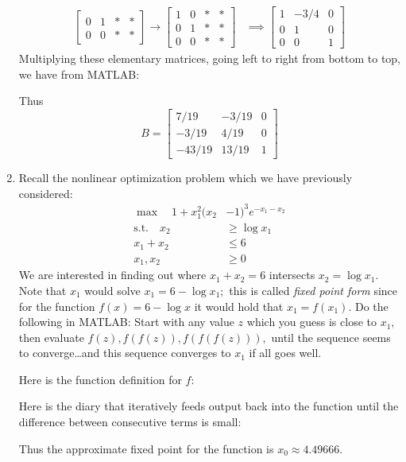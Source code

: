 \documentclass{article}
\begin{document}
\begin{enumerate}
\begin{soln}
\begin{align*}
\begin{bmatrix}
					0 & 1 & * & * \\
					0 & 0 &* & *
				\end{bmatrix} \to \begin{bmatrix}
					1 & 0 & * & * \\
					0 & 1 & * & * \\
					0 & 0 & * & *
				\end{bmatrix} &\implies \begin{bmatrix}
					1 & -3/4 & 0 \\
					0 & 1 & 0 \\
					0 & 0 & 1
				\end{bmatrix}
			\end{align*}
			Multiplying these elementary matrices, going left to right from bottom to top, we have from MATLAB:
			\lstset{language=Matlab}
			
			Thus \[B=\begin{bmatrix}
					7/19 & -3/19 & 0 \\
					-3/19 & 4/19 & 0 \\
					-43/19 & 13/19 & 1
			\end{bmatrix}\]
		\end{soln}

	\item Recall the nonlinear optimization problem which we have previously considered: 
		\begin{align*}
			\max \quad 1+x_1^2(x_2&-1)^3e^{-x_1-x_2} \\
			\text{s.t.}\quad x_2&\ge\log x_1 \\
			x_1+x_2 &\le 6 \\
			x_1, x_2 &\ge 0
		\end{align*}
		We are interested in finding out where $x_1+x_2=6$ intersects $x_2=\log x_1.$ Note that $x_1$ would solve $x_1=6-\log x_1;$ this is called \textit{fixed point form} since for the function $f(x)=6-\log x$ it would hold that $x_1=f(x_1).$ Do the following in MATLAB: Start with any value $z$ which you guess is close to $x_1,$ then evaluate $f(z), f(f(z)), f(f(f(z))),$ until the sequence seems to converge\ldots and this sequence converges to $x_1$ if all goes well.
		\begin{soln}
			Here is the function definition for $f:$
			

			Here is the diary that iteratively feeds output back into the function until the difference between consecutive terms is small:
			
			Thus the approximate fixed point for the function is $x_0\approx\boxed{4.49666.}$


\end{soln}
\end{enumerate}
\end{document}
